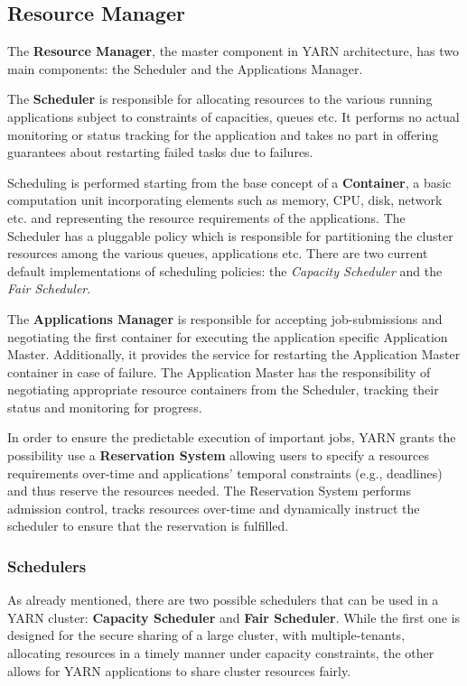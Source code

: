 \subsection{Resource Manager}

The \textbf{Resource Manager}, the master component in YARN architecture, has two main components: the Scheduler and the Applications Manager.

The \textbf{Scheduler} is responsible for allocating resources to the various running applications subject to constraints of capacities, queues etc. It performs no actual monitoring or status tracking for the application and takes no part in offering guarantees about restarting failed tasks due to failures. 

Scheduling is performed starting from the base concept of a \textbf{Container}, a basic computation unit incorporating elements such as memory, CPU, disk, network etc. and representing the resource requirements of the applications. The Scheduler has a pluggable policy which is responsible for partitioning the cluster resources among the various queues, applications etc. There are two current default implementations of scheduling policies: the \textit{Capacity Scheduler} and the \textit{Fair Scheduler}.

The \textbf{Applications Manager} is responsible for accepting job-submissions and negotiating the first container for executing the application specific Application Master. Additionally, it provides the service for restarting the Application Master container in case of failure. The Application Master has the responsibility of negotiating appropriate resource containers from the Scheduler, tracking their status and monitoring for progress.

In order to ensure the predictable execution of important jobs, YARN grants the possibility use a \textbf{Reservation System} allowing users to specify a resources requirements over-time and applications' temporal constraints (e.g., deadlines) and thus reserve the resources needed. The Reservation System  performs admission control, tracks resources over-time and dynamically instruct the scheduler to ensure that the reservation is fulfilled.

\subsubsection{Schedulers}

As already mentioned, there are two possible schedulers that can be used in a YARN cluster: \textbf{Capacity Scheduler} and \textbf{Fair Scheduler}. While the first one is designed for the secure sharing of a large cluster, with multiple-tenants, allocating resources in a timely manner under capacity constraints, the other allows for YARN applications to share cluster resources fairly.

